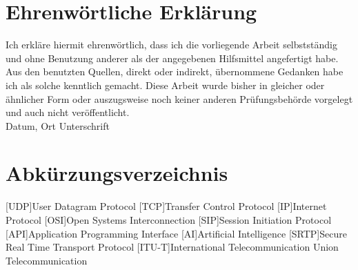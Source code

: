 \documentclass[12pt,a4paper]{article}
\begin{document}
\section*{Ehrenwörtliche Erklärung}
Ich erkläre hiermit ehrenwörtlich, dass ich die vorliegende Arbeit selbstständig und ohne Benutzung anderer als der angegebenen Hilfsmittel angefertigt habe. Aus den benutzten Quellen, direkt oder indirekt, übernommene Gedanken habe ich als solche kenntlich gemacht. Diese Arbeit wurde bisher in gleicher oder ähnlicher Form oder auszugsweise noch keiner anderen Prüfungsbehörde vorgelegt und auch nicht veröffentlicht.
\vspace{1cm}
\newline
\noindent {} \hfill {}\\
{\noindent \small Datum, Ort \hfill Unterschrift}

\newpage
\tableofcontents

\newpage
\pagestyle{fancy}
\section*{Abkürzungsverzeichnis}
\begin{acronym}
	[UDP]{User Datagram Protocol}
	[TCP]{Transfer Control Protocol}
	[IP]{Internet Protocol}
	[OSI]{Open Systems Interconnection}
	[SIP]{Session Initiation Protocol}
	[API]{Application Programming Interface}
	[AI]{Artificial Intelligence}
	[SRTP]{Secure Real Time Transport Protocol}
	[ITU-T]{International Telecommunication Union Telecommunication}
\end{acronym}

\newpage
\listoffigures
\vspace*{\fill}
\end{document}
